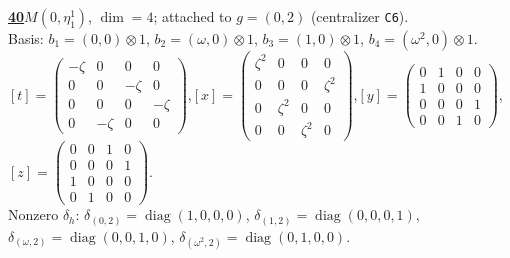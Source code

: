 \begin{samepage}\noindent\textbf{\underline{40}}\quad $M(0,\eta^{1}_{1})$, $\dim=4$; attached to $g=(0,2)$ (centralizer \texttt{C6}).\\
Basis: $b_{1}=(0,0)\otimes 1$, $b_{2}=(\omega,0)\otimes 1$, $b_{3}=(1,0)\otimes 1$, $b_{4}=(\omega^2,0)\otimes 1$.\\
$[t]=\left(\begin{smallmatrix} -\zeta & 0 & 0 & 0 \\ 0 & 0 & -\zeta & 0 \\ 0 & 0 & 0 & -\zeta \\ 0 & -\zeta & 0 & 0 \end{smallmatrix}\right)$,\quad $[x]=\left(\begin{smallmatrix} \zeta^2 & 0 & 0 & 0 \\ 0 & 0 & 0 & \zeta^2 \\ 0 & \zeta^2 & 0 & 0 \\ 0 & 0 & \zeta^2 & 0 \end{smallmatrix}\right)$,\quad $[y]=\left(\begin{smallmatrix} 0 & 1 & 0 & 0 \\ 1 & 0 & 0 & 0 \\ 0 & 0 & 0 & 1 \\ 0 & 0 & 1 & 0 \end{smallmatrix}\right)$,\quad $[z]=\left(\begin{smallmatrix} 0 & 0 & 1 & 0 \\ 0 & 0 & 0 & 1 \\ 1 & 0 & 0 & 0 \\ 0 & 1 & 0 & 0 \end{smallmatrix}\right)$.\\
Nonzero $\delta_h$: $\delta_{(0,2)}=\operatorname{diag}(1,0,0,0)$, $\delta_{(1,2)}=\operatorname{diag}(0,0,0,1)$, $\delta_{(\omega,2)}=\operatorname{diag}(0,0,1,0)$, $\delta_{(\omega^2,2)}=\operatorname{diag}(0,1,0,0)$.\end{samepage}
\medskip

